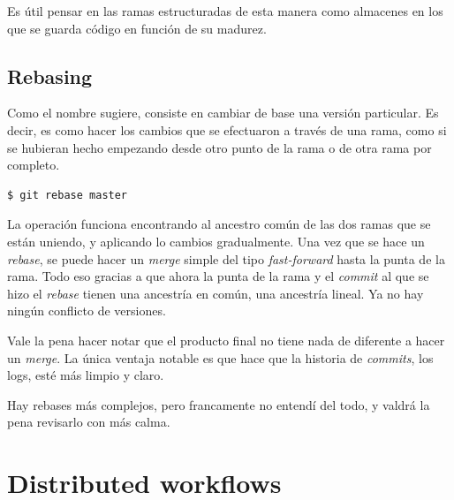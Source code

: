 \documentclass[spanish, 12pt, a4paper]{article}
\begin{document}
Es útil pensar en las ramas estructuradas de esta manera como almacenes en los que se guarda código en función de su madurez.


\subsection{Rebasing}
Como el nombre sugiere, consiste en cambiar de base una versión particular.
Es decir, es como hacer los cambios que se efectuaron a través de una rama, como si se hubieran hecho empezando desde otro punto de la rama o de otra rama por completo.
\begin{lstlisting}
$ git rebase master
\end{lstlisting}

La operación funciona encontrando al ancestro común de las dos ramas que se están uniendo, y aplicando lo cambios gradualmente.
Una vez que se hace un \textit{rebase}, se puede hacer un \textit{merge} simple del tipo \textit{fast-forward} hasta la punta de la rama.
Todo eso gracias a que ahora la punta de la rama y el \textit{commit} al que se hizo el \textit{rebase} tienen una ancestría en común, una ancestría lineal.
Ya no hay ningún conflicto de versiones.

Vale la pena hacer notar que el producto final no tiene nada de diferente a hacer un \textit{merge}.
La única ventaja notable es que hace que la historia de \textit{commits}, los logs, esté más limpio y claro.

Hay rebases más complejos, pero francamente no entendí del todo, y valdrá la pena revisarlo con más calma.

\section{Distributed workflows}
\end{document}
